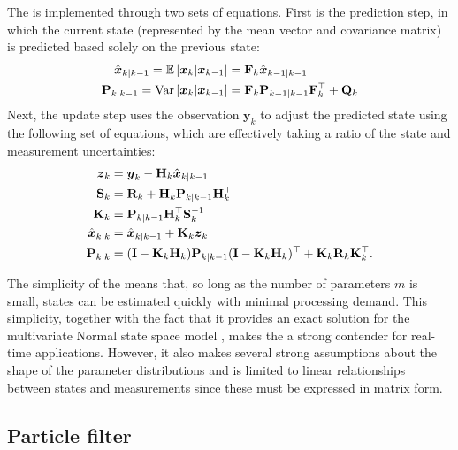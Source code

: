 The \kf{} is implemented through two sets of equations. First is the prediction step, in which the current state (represented by the mean vector and covariance matrix) is predicted based solely on the previous state:
\begin{equation}
\label{eq:ch2:kf_predict}
\begin{split}
\hat{\boldsymbol x}_{k|k-1} = \mathbb{E}\left[\boldsymbol x_k | \boldsymbol x_{k-1}\right]
    &= \mathbf{F}_k \hat{\boldsymbol x}_{k-1|k-1} \\
\mathbf{P}_{k|k-1} = \mathrm{Var}\left[\boldsymbol x_k | \boldsymbol x_{k-1}\right]
    &= \mathbf{F}_k \mathbf{P}_{k-1|k-1} \mathbf{F}_k^\top + \mathbf{Q}_k
\end{split}
\end{equation}
Next, the update step uses the observation $\boldsymbol{y}_k$ to adjust the predicted state using the following set of equations, which are effectively taking a ratio of the state and measurement uncertainties:
\begin{equation}
\label{eq:ch2:kf_update}
\begin{split}
\boldsymbol z_k &= \boldsymbol{y}_k - \mathbf{H}_k \hat{\boldsymbol x}_{k|k-1} \\
\mathbf{S}_k &= \mathbf{R}_k + \mathbf{H}_k \mathbf{P}_{k|k-1} \mathbf{H}_k^\top \\
\mathbf{K}_k &= \mathbf{P}_{k|k-1} \mathbf{H}_k^\top \mathbf{S}_k^{-1} \\
\hat{\boldsymbol x}_{k|k} &= \hat{\boldsymbol x}_{k|k-1} + \mathbf{K}_k \boldsymbol z_k \\
\mathbf{P}_{k|k} &= (\mathbf{I} - \mathbf{K}_k \mathbf{H}_k) \mathbf{P}_{k|k-1}
    (\mathbf{I} - \mathbf{K}_k \mathbf{H}_k)^\top + \mathbf{K}_k \mathbf{R}_k \mathbf{K}_k^\top.
\end{split}
\end{equation}


The simplicity of the \kf{} means that, so long as the number of parameters $m$ is small, states can be estimated quickly with minimal processing demand. This simplicity, together with the fact that it provides an exact solution for the multivariate Normal state space model \citep{Anderson_1979}, makes the \kf{} a strong contender for real-time applications. However, it also makes several strong assumptions about the shape of the parameter distributions and is limited to linear relationships between states and measurements since these must be expressed in matrix form.



\subsection{Particle filter}
\label{sec:pf}

